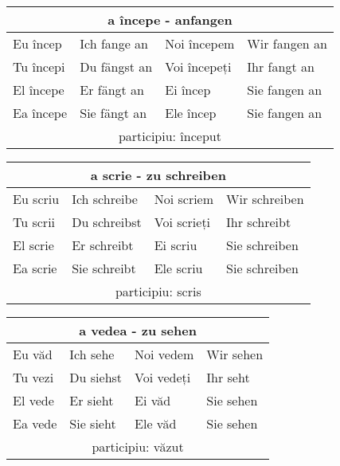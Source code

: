 \documentclass[11pt, oneside]{article}
\begin{document}
%
\begin{center}
  \begin{tabular}{ |p{3.25cm}|p{3.25cm}||p{3.25cm}|p{3.25cm}| }
      \hline
      \multicolumn{4}{|c|}{a începe - anfangen} \\
      \hline
      \hline
      Eu încep & Ich fange an & Noi începem & Wir fangen an\\
      \hline
      Tu începi & Du fängst an & Voi începeți & Ihr fangt an\\
      \hline
      El începe & Er fängt an & Ei încep & Sie fangen an\\ 
      Ea începe & Sie fängt an & Ele încep & Sie fangen an\\
      \hline
      \multicolumn{4}{|c|}{participiu: început} \\
      \hline
     \end{tabular}
\end{center}
%
\begin{center}
  \begin{tabular}{ |p{3.25cm}|p{3.25cm}||p{3.25cm}|p{3.25cm}| }
      \hline
      \multicolumn{4}{|c|}{a scrie - zu schreiben} \\
      \hline
      \hline
      Eu scriu & Ich schreibe & Noi scriem & Wir schreiben\\
      \hline
      Tu scrii & Du schreibst & Voi scrieți & Ihr schreibt\\
      \hline
      El scrie & Er schreibt & Ei scriu & Sie schreiben\\ 
      Ea scrie & Sie schreibt & Ele scriu & Sie schreiben\\
      \hline
      \multicolumn{4}{|c|}{participiu: scris} \\
      \hline
     \end{tabular}
\end{center}
%
\begin{center}
  \begin{tabular}{ |p{3.25cm}|p{3.25cm}||p{3.25cm}|p{3.25cm}| }
      \hline
      \multicolumn{4}{|c|}{a vedea - zu sehen} \\
      \hline
      \hline
      Eu văd & Ich sehe & Noi vedem & Wir sehen\\
      \hline
      Tu vezi & Du siehst & Voi vedeți & Ihr seht\\
      \hline
      El vede & Er sieht & Ei văd & Sie sehen\\ 
      Ea vede & Sie sieht & Ele văd & Sie sehen\\
      \hline
      \multicolumn{4}{|c|}{participiu: văzut} \\
      \hline
     \end{tabular}
\end{center}
\end{document}
